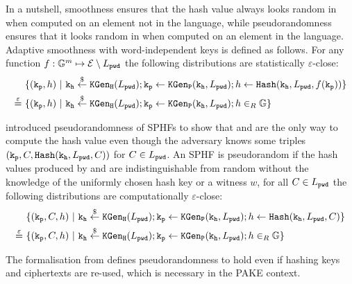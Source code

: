\noindent
In a nutshell, smoothness ensures that the hash value always looks random in \GG when computed on an element not in the language, while pseudorandomness ensures that it looks random in \GG when computed on an element in the language.
Adaptive smoothness with word-independent keys is defined as follows.
For any function $f:\mathbb{G}^m \mapsto \mathcal{E}\setminus L_\mathtt{pwd}$ the following distributions are statistically $\varepsilon$-close:
\begin{align*}
& \{(\mathtt{k_p},h) ~|~ \mathtt{k_h}\stackrel{\$}{\gets}\mathtt{KGen_H}(L_\mathtt{pwd}); \mathtt{k_p}\gets\mathtt{KGen_P}(\mathtt{k_h},L_\mathtt{pwd}); h\gets\mathtt{Hash}(\mathtt{k_h},L_\mathtt{pwd},f(\mathtt{k_p}))\} \\
\stackrel{\varepsilon}{=}~ & \{(\mathtt{k_p},h) ~|~ \mathtt{k_h}\stackrel{\$}{\gets}\mathtt{KGen_H}(L_\mathtt{pwd}); \mathtt{k_p}\gets\mathtt{KGen_P}(\mathtt{k_h},L_\mathtt{pwd}); h\in_R\mathbb{G}\}
\end{align*}

\noindent
\citet{Gennaro2003} introduced pseudorandomness of \acp{SPHF} to show that \Hash and \ProjHash are the only way to compute the hash value even though the adversary knows some triples $(\mathtt{k_p},C,\mathtt{Hash}(\mathtt{k_h},\allowbreak L_\mathtt{pwd},C))$ for $C\in L_\mathtt{pwd}$.
An \ac{SPHF} is pseudorandom if the hash values produced by \Hash and \ProjHash are indistinguishable from random without the knowledge of the uniformly chosen hash key \hk or a witness $w$, \ie for all $C\in L_\mathtt{pwd}$ the following distributions are computationally $\varepsilon$-close:
\begin{align*}
& \{(\mathtt{k_p},C,h) ~|~ \mathtt{k_h}\stackrel{\$}{\gets}\mathtt{KGen_H}(L_\mathtt{pwd}); \mathtt{k_p}\gets\mathtt{KGen_P}(\mathtt{k_h},L_\mathtt{pwd}); h\gets\mathtt{Hash}(\mathtt{k_h},L_\mathtt{pwd},C)\} \\
\stackrel{\varepsilon}{=}~ & \{(\mathtt{k_p},C,h) ~|~ \mathtt{k_h}\stackrel{\$}{\gets}\mathtt{KGen_H}(L_\mathtt{pwd}); \mathtt{k_p}\gets\mathtt{KGen_P}(\mathtt{k_h},L_\mathtt{pwd}); h\in_R\mathbb{G}\}
\end{align*}

\noindent
The formalisation from \citet{Katz2011} defines pseudorandomness to hold even if hashing keys and ciphertexts are re-used, which is necessary in the \ac{PAKE} context.

